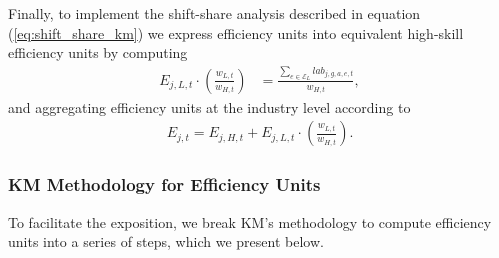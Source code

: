 \documentclass[10pt]{article}
\begin{document}
Finally, to implement the shift-share analysis described in equation (\ref{eq:shift_share_km}) we express efficiency units into equivalent high-skill efficiency units by computing
\begin{align*}
    E_{j,L,t} \cdot \left(\frac{w_{L,t}}{w_{H,t}}\right) & = \frac{ \sum\limits_{ e \in \mathcal{E} _{L} }  lab_{j,g,a,e,t} }{ w_{H,t} },
\end{align*}
and aggregating efficiency units at the industry level according to
\begin{align*}
    E_{j,t} = E_{j,H,t} + E_{j,L,t} \cdot \left(\frac{w_{L,t}}{w_{H,t}}\right) .
\end{align*}
\subsubsection{KM Methodology for Efficiency Units} \label{subsec:km_eff_methodology}
To facilitate the exposition, we break KM's methodology to compute efficiency units into a series of steps, which we present below. 
\end{document}
